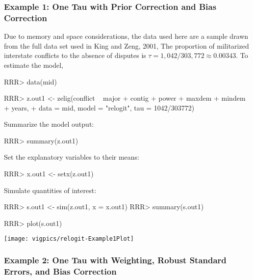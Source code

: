 \subsubsection*{Example 1: One Tau with Prior Correction and Bias Correction}

Due to memory and space considerations, the data used here are a
sample drawn from the full data set used in King and Zeng,
2001,\nocite{KinZen01b}  The proportion of militarized interstate
conflicts to the absence of disputes is $\tau = 1,042 / 303,772
\approx 0.00343$.  To estimate the model,
\begin{Schunk}
\begin{Sinput}
RRR>  data(mid)
\end{Sinput}
\end{Schunk}
\begin{Schunk}
\begin{Sinput}
RRR>  z.out1 <- zelig(conflict ~ major + contig + power + maxdem + mindem + years,
+                   data = mid, model = "relogit", tau = 1042/303772)
\end{Sinput}
\end{Schunk}
Summarize the model output:  
\begin{Schunk}
\begin{Sinput}
RRR>  summary(z.out1)
\end{Sinput}
\end{Schunk}
Set the explanatory variables to their means:  
\begin{Schunk}
\begin{Sinput}
RRR>  x.out1 <- setx(z.out1)
\end{Sinput}
\end{Schunk}
Simulate quantities of interest:
\begin{Schunk}
\begin{Sinput}
RRR>  s.out1 <- sim(z.out1, x = x.out1)
RRR>  summary(s.out1)
\end{Sinput}
\end{Schunk}
\begin{center} 
\begin{Schunk}
\begin{Sinput}
RRR>  plot(s.out1)
\end{Sinput}
\end{Schunk}
\texttt{[image: vigpics/relogit-Example1Plot]}
\end{center}

\subsubsection*{Example 2: One Tau with Weighting, Robust Standard
Errors, and Bias Correction} 

